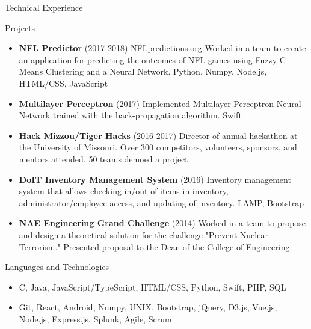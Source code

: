 \documentclass[]{mcdowellcv}
\begin{document}
    \begin{cvsection}{Technical Experience}
        \begin{cvsubsection}{Projects}{}{}
            \begin{itemize}
               \item \textbf{NFL Predictor} (2017-2018) \href{http://NFLpredictions.org}{NFLpredictions.org} Worked in a team to create an application for predicting the outcomes of NFL games using Fuzzy C-Means Clustering and a Neural Network. Python, Numpy, Node.js, HTML/CSS, JavaScript
                \item \textbf{Multilayer Perceptron} (2017) Implemented Multilayer Perceptron Neural Network trained with the back-propagation algorithm. Swift
                \item \textbf{Hack Mizzou/Tiger Hacks} (2016-2017) Director of annual hackathon at the University of Missouri. Over 300 competitors, volunteers, sponsors, and mentors attended. 50 teams demoed a project.
                \item \textbf{DoIT Inventory Management System} (2016) Inventory management system that allows checking in/out of items in inventory, administrator/employee access, and updating of inventory. LAMP, Bootstrap
                \item \textbf{NAE Engineering Grand Challenge} (2014) Worked in a team to propose and design a theoretical solution for the challenge "Prevent Nuclear Terrorism." Presented proposal to the Dean of the College of Engineering.
            \end{itemize}
        \end{cvsubsection}

        \begin{cvsubsection}{Languages and Technologies}{}{}
            \begin{itemize}
                \item C, Java, JavaScript/TypeScript, HTML/CSS, Python, Swift, PHP, SQL
                \item Git, React, Android, Numpy, UNIX, Bootstrap, jQuery, D3.js, Vue.js, Node.js, Express.js, Splunk, Agile, Scrum
            \end{itemize}
        \end{cvsubsection}
    \end{cvsection}
    
\end{document}
